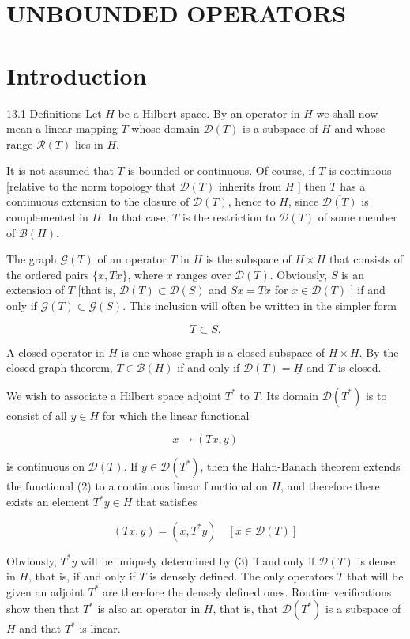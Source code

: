 \documentclass[10pt]{article}
\begin{document}
\section{UNBOUNDED OPERATORS}
\section{Introduction}
13.1 Definitions Let $H$ be a Hilbert space. By an operator in $H$ we shall now mean a linear mapping $T$ whose domain $\mathscr{D}(T)$ is a subspace of $H$ and whose range $\mathscr{R}(T)$ lies in $H$.

It is not assumed that $T$ is bounded or continuous. Of course, if $T$ is continuous [relative to the norm topology that $\mathscr{D}(T)$ inherits from $H$ ] then $T$ has a continuous extension to the closure of $\mathscr{D}(T)$, hence to $H$, since $\overline{\mathscr{D}(T)}$ is complemented in $H$. In that case, $T$ is the restriction to $\mathscr{D}(T)$ of some member of $\mathscr{B}(H)$.

The graph $\mathscr{G}(T)$ of an operator $T$ in $H$ is the subspace of $H \times H$ that consists of the ordered pairs $\{x, T x\}$, where $x$ ranges over $\mathscr{D}(T)$. Obviously, $S$ is an extension of $T$ [that is, $\mathscr{D}(T) \subset \mathscr{D}(S)$ and $S x=T x$ for $x \in \mathscr{D}(T)$ ] if and only if $\mathscr{G}(T) \subset \mathscr{G}(S)$. This inclusion will often be written in the simpler form

$$
T \subset S .
$$

A closed operator in $H$ is one whose graph is a closed subspace of $H \times H$. By the closed graph theorem, $T \in \mathscr{B}(H)$ if and only if $\mathscr{D}(T)=\underline{H}$ and $T$ is closed.

We wish to associate a Hilbert space adjoint $T^{*}$ to $T$. Its domain $\mathscr{D}\left(T^{*}\right)$ is to consist of all $y \in H$ for which the linear functional

$$
x \rightarrow(T x, y)
$$

is continuous on $\mathscr{D}(T)$. If $y \in \mathscr{D}\left(T^{*}\right)$, then the Hahn-Banach theorem extends the functional (2) to a continuous linear functional on $H$, and therefore there exists an element $T^{*} y \in H$ that satisfies

$$
(T x, y)=\left(x, T^{*} y\right) \quad[x \in \mathscr{D}(T)]
$$

Obviously, $T^{*} y$ will be uniquely determined by (3) if and only if $\mathscr{D}(T)$ is dense in $H$, that is, if and only if $T$ is densely defined. The only operators $T$ that will be given an adjoint $T^{*}$ are therefore the densely defined ones. Routine verifications show then that $T^{*}$ is also an operator in $H$, that is, that $\mathscr{D}\left(T^{*}\right)$ is a subspace of $H$ and that $T^{*}$ is linear.
\end{document}
